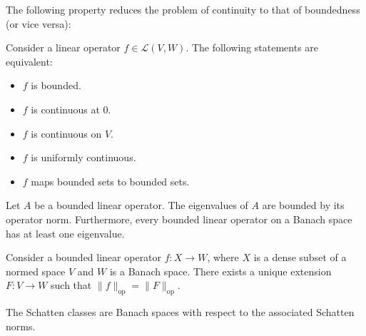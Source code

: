     The following property reduces the problem of continuity to that of boundedness (or vice versa):
    \begin{property}\label{functional:bounded_continuous}
        Consider a linear operator $f\in\mathcal{L}(V, W)$. The following statements are equivalent:
        \begin{itemize}
            \item $f$ is bounded.
            \item $f$ is continuous at 0.
            \item $f$ is continuous on $V$.
            \item $f$ is uniformly continuous.
            \item $f$ maps bounded sets to bounded sets.
        \end{itemize}
    \end{property}

    \begin{property}
        Let $A$ be a bounded linear operator. The eigenvalues of $A$ are bounded by its operator norm. Furthermore, every bounded linear operator on a Banach space has at least one eigenvalue.
    \end{property}

    \begin{property}
        Consider a bounded linear operator $f:X\rightarrow W$, where $X$ is a dense subset of a normed space $V$ and $W$ is a Banach space. There exists a unique extension $F:V\rightarrow W$ such that $\|f\|_\mathrm{op} = \|F\|_\mathrm{op}$.
    \end{property}

    \begin{property}
        The Schatten classes are Banach spaces with respect to the associated Schatten norms.
    \end{property}


